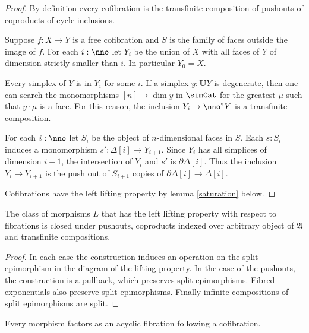 \documentclass{tac}
\newcommand\ri{^*}
\newcommand\of{:}
\newcommand\simplex\Delta
\newcommand\cycle{\partial\Delta}
\newcommand\base{\mathbf{U}}
\newcommand\ambient{\mathfrak A}
\begin{document}
\begin{proof} By definition every cofibration is the transfinite composition of pushouts of coproducts of cycle inclusions.

Suppose $f\of X\to Y$ is a free cofibration and $S$ is the family of faces outside the image of $f$. For each $i\of\nno$ let $Y_i$ be the union of $X$ with all faces of $Y$ of dimension strictly smaller than $i$. In particular $Y_0=X$.

Every simplex of $Y$ is in $Y_i$ for some $i$. If a simplex $y\of\base Y$ is degenerate, then one can search the monomorphisms $[n]\to\dim y$ in $\simCat$ for the greatest $\mu$ such that $y\cdot\mu$ is a face. For this reason, the inclusion $Y_i\to\nno\ri Y$ is a transfinite composition.

For each $i\of\nno$ let $S_i$ be the object of $n$-dimensional faces in $S$. Each $s\of S_i$ induces a monomorphism $s'\of\simplex[i]\to Y_{i+1}$. Since $Y_{i}$ has all simplices of dimension $i-1$, the intersection of $Y_i$ and $s'$ is $\cycle[i]$. Thus the inclusion $Y_i\to Y_{i+1}$ is the push out of $S_{i+1}$ copies of $\cycle[i]\to\simplex[i]$. 

Cofibrations have the left lifting property by lemma \ref{saturation} below.
\end{proof}


\begin{lemma} The class of morphisms $L$ that has the left lifting property with respect to fibrations is closed under pushouts, coproducts indexed over arbitrary object of $\ambient$ and transfinite compositions. \label{saturation}
\end{lemma}

\begin{proof}
In each case the construction induces an operation on the split epimorphism in the diagram of the lifting property. 
In the case of the pushouts, the construction is a pullback, which preserves split epimorphisms.
Fibred exponentials also preserve split epimorphisms. Finally infinite compositions of split epimorphisms are split.
\end{proof}


\begin{proposition} Every morphism factors as an acyclic fibration following a cofibration. \label{factor1} \end{proposition}
\end{document}
